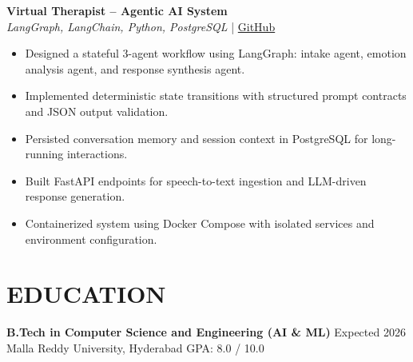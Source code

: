 \documentclass[10pt]{article}
\begin{document}
\textbf{Virtual Therapist -- Agentic AI System} \\
\textit{LangGraph, LangChain, Python, PostgreSQL} \;|\;
\href{https://github.com/JeetInTech/Virtual-Therapist---LangGraph-Agentic-AI-System}{GitHub}
\begin{itemize}
\item Designed a stateful 3-agent workflow using LangGraph: intake agent, emotion analysis agent, and response synthesis agent.
\item Implemented deterministic state transitions with structured prompt contracts and JSON output validation.
\item Persisted conversation memory and session context in PostgreSQL for long-running interactions.
\item Built FastAPI endpoints for speech-to-text ingestion and LLM-driven response generation.
\item Containerized system using Docker Compose with isolated services and environment configuration.
\end{itemize}

\section*{EDUCATION}
\textbf{B.Tech in Computer Science and Engineering (AI \& ML)} \hfill Expected 2026 \\
Malla Reddy University, Hyderabad \hfill GPA: 8.0 / 10.0
\end{document}
